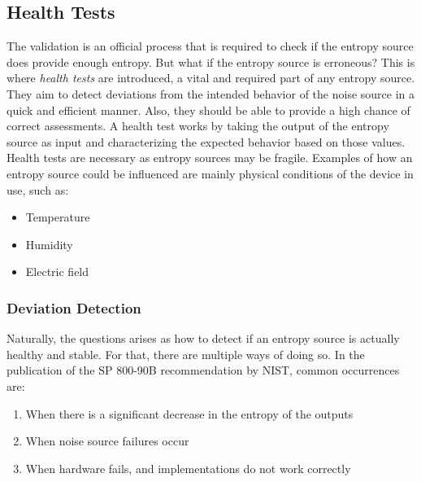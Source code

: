 \subsection{Health Tests}
The validation is an official process that is required to check if the entropy source does provide enough entropy.
But what if the entropy source is erroneous? This is where \emph{health tests} are introduced, a vital and required part of any entropy source.
\newline
They aim to detect deviations from the intended behavior of the noise source in a quick and efficient manner.
Also, they should be able to provide a high chance of correct assessments.
A health test works by taking the output of the entropy source as input and characterizing the expected behavior based on those values.
\emptyline
Health tests are necessary as entropy sources may be fragile. Examples of how an entropy source could be influenced are mainly physical conditions of the device in use, such as:
\begin{itemize}
    \item Temperature
    \item Humidity
    \item Electric field
\end{itemize}

\subsubsection{Deviation Detection}
Naturally, the questions arises as how to detect if an entropy source is actually healthy and stable.
For that, there are multiple ways of doing so. In the publication of the SP 800-90B recommendation by NIST\cite{randomness:sources1}, common occurrences are:
\begin{enumerate}
\item When there is a significant decrease in the entropy of the outputs
\item When noise source failures occur
\item When hardware fails, and implementations do not work correctly
\end{enumerate}

